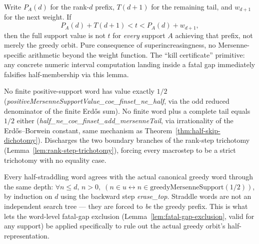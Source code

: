 \begin{lem}
\label{lem:fatal-gap-exclusion}
Write $P_A(d)$ for the rank-$d$ prefix, $T(d+1)$ for the remaining tail, and $w_{d+1}$ for
the next weight. If
\[
P_A(d)+T(d+1)<t<P_A(d)+w_{d+1},
\]
then the full support value is not $t$ for \emph{every} support $A$
achieving that prefix, not merely the greedy orbit. Pure consequence of
superincreasingness, no Mersenne-specific arithmetic beyond the weight function. The
``kill certificate'' primitive: any concrete numeric interval computation landing inside a
fatal gap immediately falsifies half-membership via this lemma.
\par{}
\end{lem}

\begin{lem}
\label{lem:half-endpoint-kills}
No finite positive-support word has value exactly $1/2$
(\emph{positiveMersenneSupportValue\_coe\_finset\_ne\_half}, via the odd reduced
denominator of the finite Erd\H{o}s sum). No finite word plus a complete tail equals
$1/2$ either (\emph{half\_ne\_coe\_finset\_add\_mersenneTail}, via irrationality of the
Erd\H{o}s--Borwein constant, same mechanism as Theorem~\ref{thm:half-skip-dichotomy}).
Discharges the two boundary branches of the rank-step trichotomy
(Lemma~\ref{lem:rank-step-trichotomy}), forcing every macrostep to be a strict trichotomy
with no equality case.
\par{}
\end{lem}

\begin{lem}
\label{lem:straddle-agrees-greedy}
Every half-straddling word agrees with the actual canonical greedy word through the same
depth: $\forall n\le d,\, n>0,\; (n\in u \leftrightarrow n\in
\mathrm{greedyMersenneSupport}(1/2))$, by induction on $d$ using the backward step
\emph{erase\_top}. Straddle words are not an independent search tree — they are forced to
\emph{be} the greedy prefix. This is what lets the word-level fatal-gap exclusion
(Lemma~\ref{lem:fatal-gap-exclusion}, valid for any support) be applied specifically to
rule out the actual greedy orbit's half-representation.
\par{}
\end{lem}

